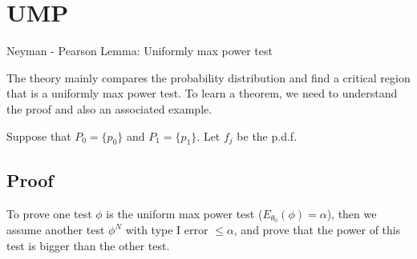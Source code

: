 \section{UMP}
Neyman - Pearson Lemma: Uniformly max power test

The theory mainly compares the probability distribution and find a critical region that is a uniformly max power test. To learn a theorem, we need to understand the proof and also an associated example. 

Suppose that $P_0 = \{ p_0\}$ and $P_1 = \{ p_1\}$. Let $f_j$ be the p.d.f. 

\subsection{Proof}
To prove one test $\phi$ is the uniform max power test ($E_{\theta_0}(\phi) = \alpha$), then we assume another test $\phi^{N}$ with type I error $\leq \alpha$, and prove that the power of this test is bigger than the other test.

